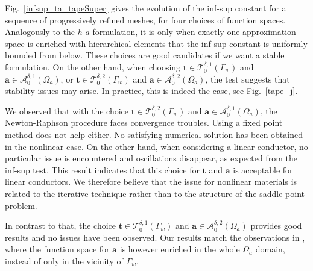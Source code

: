 \documentclass[journal]{IEEEtran}
\renewcommand{\vec}[1]{\boldsymbol{#1}} %
\renewcommand{\a}{\vec a}
\renewcommand{\t}{\vec t}
\newcommand{\Oa}{\Omega_a}
\newcommand{\hafOnly}{$h$-$a$-formulation}
\newcommand{\aspzdone}{\mathcal{A}_{0}^{\delta,1}}
\newcommand{\tspzdone}{\mathcal{T}_{0}^{\delta,1}}
\newcommand{\aspzdtwo}{\mathcal{A}_{0}^{\delta,2}}
\newcommand{\tspzdtwo}{\mathcal{T}_{0}^{\delta,2}}
\begin{document}
Fig.~\ref{infsup_ta_tapeSuper} gives the evolution of the inf-sup constant for a sequence of progressively refined meshes, for four choices of function spaces. Analogously to the \hafOnly, it is only when exactly one approximation space is enriched with hierarchical elements that the inf-sup constant is uniformly bounded from below. These choices are good candidates if we want a stable formulation. On the other hand, when choosing $\t \in \tspzdone(\Gamma_w)$ and $\a \in \aspzdone(\Oa)$, or $\t \in \tspzdtwo(\Gamma_w)$ and $\a \in \aspzdtwo(\Oa)$, the test suggests that stability issues may arise. In practice, this is indeed the case, see Fig.~\ref{tape_j}.


We observed that with the choice $\t \in \tspzdtwo(\Gamma_w)$ and $\a \in \aspzdone(\Oa)$, the Newton-Raphson procedure faces convergence troubles. Using a fixed point method does not help either. No satisfying numerical solution has been obtained in the nonlinear case. On the other hand, when considering a linear conductor, no particular issue is encountered and oscillations disappear, as expected from the inf-sup test. This result indicates that this choice for $\t$ and $\a$ is acceptable for linear conductors. We therefore believe that the issue for nonlinear materials is related to the iterative technique rather than to the structure of the saddle-point problem. 

In contrast to that, the choice $\t \in \tspzdone(\Gamma_w)$ and $\a \in \aspzdtwo(\Oa)$ provides good results and no issues have been observed. Our results match the observations in \cite{berrospe2019real}, where the function space for $\a$ is however enriched in the whole $\Oa$ domain, instead of only in the vicinity of $\Gamma_w$.



\end{document}
